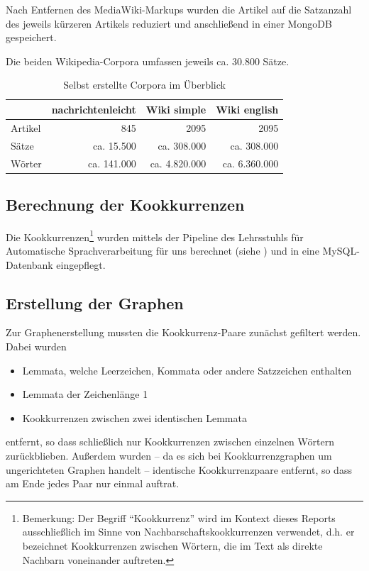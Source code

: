 \documentclass[11pt, a4paper]{article}
\begin{document}
Nach Entfernen des MediaWiki-Markups wurden die Artikel auf die Satzanzahl
des jeweils k\"urzeren Artikels reduziert und anschließend in einer MongoDB
gespeichert.

Die beiden Wikipedia-Corpora umfassen jeweils ca. 30.800 Sätze.

\begin{table}[ht]
  \centering
  \begin{tabular}{lrrr}
    \toprule
                &  nachrichtenleicht & Wiki simple   & Wiki english\\
    \midrule
    Artikel     & 845                & 2095          & 2095\\
    Sätze       & ca. 15.500         & ca. 308.000   & ca. 308.000\\
    Wörter      & ca. 141.000        & ca. 4.820.000 & ca. 6.360.000\\
    \bottomrule
  \end{tabular}
  \caption{\label{tab:corpora} Selbst erstellte Corpora im Überblick}
\end{table}


\subsection{Berechnung der Kookkurrenzen}

Die Kookkurrenzen\footnote{Bemerkung: Der Begriff "`Kookkurrenz"' wird im
Kontext dieses Reports ausschließlich im Sinne von Nachbarschaftskookkurrenzen
verwendet, d.h. er bezeichnet Kookkurrenzen zwischen Wörtern, die im Text als
direkte Nachbarn voneinander auftreten.}
wurden mittels der Pipeline des Lehrsstuhls f\"ur
Automatische Sprachverarbeitung für uns berechnet (siehe \cite{Biemann2004})
und in eine MySQL-Datenbank eingepflegt.


\subsection{Erstellung der Graphen}

Zur Graphenerstellung mussten die Kookkurrenz-Paare zunächst gefiltert werden.
Dabei wurden 
\begin{itemize}
    \item Lemmata, welche Leerzeichen, Kommata oder andere Satzzeichen enthalten
    \item Lemmata der Zeichenlänge 1
    \item Kookkurrenzen zwischen zwei identischen Lemmata
\end{itemize}
entfernt, so dass schließlich nur Kookkurrenzen zwischen einzelnen Wörtern
zurückblieben.
Außerdem wurden -- da es sich bei Kookkurrenzgraphen um ungerichteten Graphen
handelt -- identische
Kookkurrenzpaare entfernt, so dass am Ende jedes Paar nur einmal auftrat.
\end{document}

